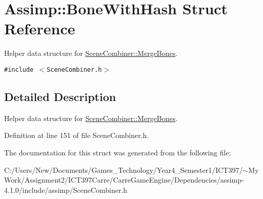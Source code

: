 \hypertarget{struct_assimp_1_1_bone_with_hash}{
\section{Assimp::BoneWithHash Struct Reference}
\label{struct_assimp_1_1_bone_with_hash}
}
Helper data structure for \hyperlink{class_assimp_1_1_scene_combiner_a42d5370510db89cbdd739617a617d4e}{SceneCombiner::MergeBones}.  


{\tt \#include $<$SceneCombiner.h$>$}



\subsection{Detailed Description}
Helper data structure for \hyperlink{class_assimp_1_1_scene_combiner_a42d5370510db89cbdd739617a617d4e}{SceneCombiner::MergeBones}. 

Definition at line 151 of file SceneCombiner.h.

The documentation for this struct was generated from the following file:\begin{CompactItemize}
\item 
C:/Users/New/Documents/Games\_\-Technology/Year4\_\-Semester1/ICT397/$\sim$My Work/Assignment2/ICT397Carre/CarreGameEngine/Dependencies/assimp-4.1.0/include/assimp/SceneCombiner.h\end{CompactItemize}
